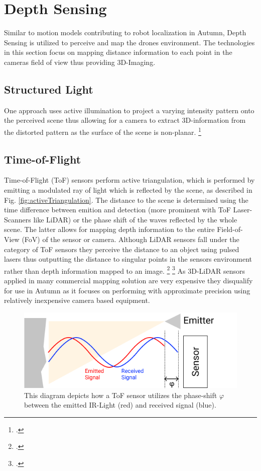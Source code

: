 \section{Depth Sensing}
Similar to motion models contributing to robot localization in Autumn, Depth Sensing is utilized to perceive and map the drones environment. 
The technologies in this section focus on mapping distance information to each point in the cameras field of view thus providing 3D-Imaging.

\subsection{Structured Light}
One approach uses active illumination to project a varying intensity pattern onto the perceived scene thus allowing for a camera to extract 3D-information from the distorted pattern as the surface of the scene is non-planar. \footcite{geng2011StructuredLight}

\subsection{Time-of-Flight}
Time-of-Flight (ToF) sensors perform active triangulation, which is performed by emitting a modulated ray of light which is reflected by the scene, as described in Fig. \ref{fig:activeTriangulation}. The distance to the scene is determined using the time difference between emition and detection (more prominent with ToF Laser-Scanners like LiDAR) or the phase shift of the waves reflected by the whole scene. The latter allows for mapping depth information to the entire Field-of-View (FoV) of the sensor or camera. 
Although LiDAR sensors fall under the category of ToF sensors they perceive the distance to an object using pulsed lasers thus outputting
the distance to singular points in the sensors environment rather than depth information mapped to an image. \footcite{gokturk2004time} \footcite{velodyne2021LiDAR}
As 3D-LiDAR sensors applied in many commercial mapping solution are very expensive they disqualify for use in Autumn as it focuses on performing with approximate precision using relatively inexpensive camera based equipment. 

\begin{figure}
	\centering
	\includegraphics[width=0.8\linewidth]{img/activeTriangulation}
	\caption{
		This diagram depicts how a ToF sensor utilizes the phase-shift $\varphi$ between the emitted IR-Light (red) and received signal (blue). 
	}
	\label{fig:activeTriangulatoin}
\end{figure}


